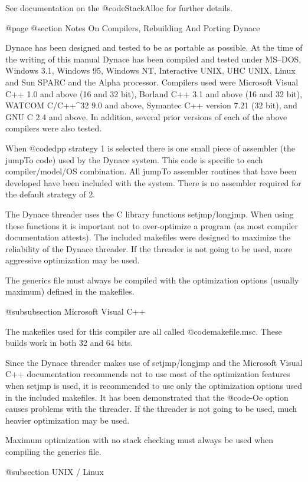 See documentation on the @code{StackAlloc} for further details.


@page
@section Notes On Compilers, Rebuilding And Porting Dynace

Dynace has been designed and tested to be as portable as possible.  At
the time of the writing of this manual Dynace has been compiled and
tested under MS--DOS, Windows 3.1, Windows 95, Windows NT, Interactive
UNIX, UHC UNIX, Linux and Sun SPARC and the Alpha processor.  Compilers
used were Microsoft Visual C++ 1.0 and above (16 and 32 bit), Borland
C++ 3.1 and above (16 and 32 bit), WATCOM C/C++^32 9.0 and above,
Symantec C++ version 7.21 (32 bit), and GNU C 2.4 and above.  In addition,
several prior versions of each of the above compilers were also tested.

When @code{dpp} strategy 1 is selected there is one small piece of
assembler (the jumpTo code) used by the Dynace system.  This code is
specific to each compiler/model/OS combination.  All jumpTo assembler
routines that have been developed have been included with the system.
There is no assembler required for the default strategy of 2.

The Dynace threader uses the C library functions setjmp/longjmp.  When using
these functions it is important not to over-optimize a program (as most
compiler documentation attests).  The included makefiles were designed
to maximize the reliability of the Dynace threader.  If the threader is not
going to be used, more aggressive optimization may be used.

The generics file must always be compiled with the optimization options
(usually maximum) defined in the makefiles.


@subsubsection Microsoft Visual C++

The makefiles used for this compiler are all called @code{makefile.msc}.
These builds work in both 32 and 64 bits.

Since the Dynace threader makes use of setjmp/longjmp and the Microsoft
Visual C++ documentation recommends not to use most of the optimization
features when setjmp is used, it is recommended to use only the
optimization options used in the included makefiles.  It has been
demonstrated that the @code{-Oe} option causes problems with the
threader.  If the threader is not going to be used, much heavier
optimization may be used.

Maximum optimization with no stack checking must always be used when
compiling the generics file.

@subsection UNIX / Linux

